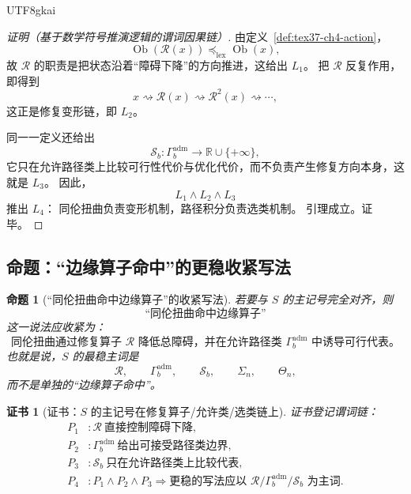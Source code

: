 \documentclass[12pt]{article}
\newtheorem{proposition}{命题}[section]
\newtheorem{Certificate}{证书}[section]
\begin{document}
\begin{CJK*}{UTF8}{gkai}
\begin{proof}[证明（基于数学符号推演逻辑的谓词因果链）]
由定义~\ref{def:tex37-ch4-action}，
\[
  \operatorname{Ob}(\mathcal R(x))
  \preceq_{\mathrm{lex}}
  \operatorname{Ob}(x),
\]
故 $\mathcal R$ 的职责是把状态沿着“障碍下降”的方向推进，这给出 $L_1$。
把 $\mathcal R$ 反复作用，即得到
\[
  x\rightsquigarrow \mathcal R(x)\rightsquigarrow \mathcal R^2(x)\rightsquigarrow\cdots,
\]
这正是修复变形链，即 $L_2$。

同一一定义还给出
\[
  \mathcal S_b:\Gamma_b^{\mathrm{adm}}\to\mathbb R\cup\{+\infty\},
\]
它只在允许路径类上比较可行性代价与优化代价，而不负责产生修复方向本身，这就是 $L_3$。
因此，
\[
  L_1\wedge L_2\wedge L_3
\]
推出 $L_4$：
同伦扭曲负责变形机制，路径积分负责选类机制。
引理成立。证毕。
\end{proof}

\subsection{命题：“边缘算子命中”的更稳收紧写法}
\label{subsec:tex37-ch20-prop-operator}

\begin{proposition}[“同伦扭曲命中边缘算子”的收紧写法]
\label{prop:tex37-ch20-operator-phrase}
若要与 $S$ 的主记号完全对齐，则
\[
  \text{“同伦扭曲命中边缘算子”}
\]
这一说法应收紧为：
\[
  \boxed{
    \text{同伦扭曲通过修复算子 }\mathcal R\text{ 降低总障碍，}
    \text{并在允许路径类 }\Gamma_b^{\mathrm{adm}}\text{ 中诱导可行代表。}
  }
\]
也就是说，$S$ 的最稳主词是
\[
  \mathcal R,\qquad
  \Gamma_b^{\mathrm{adm}},\qquad
  \mathcal S_b,\qquad
  \Sigma_n,\qquad
  \Theta_n,
\]
而不是单独的“边缘算子命中”。
\end{proposition}

\begin{Certificate}[证书：$S$ 的主记号在修复算子/允许类/选类链上]
\label{cert:tex37-ch20-operator-phrase}
证书登记谓词链：
\[
\begin{aligned}
  P_1 &: \mathcal R\ \text{直接控制障碍下降},\\
  P_2 &: \Gamma_b^{\mathrm{adm}}\ \text{给出可接受路径类边界},\\
  P_3 &: \mathcal S_b\ \text{只在允许路径类上比较代表},\\
  P_4 &: P_1\wedge P_2\wedge P_3\Rightarrow \text{更稳的写法应以 }\mathcal R/\Gamma_b^{\mathrm{adm}}/\mathcal S_b\text{ 为主词}.
\end{aligned}
\]
\end{Certificate}


\end{CJK*}
\end{document}
